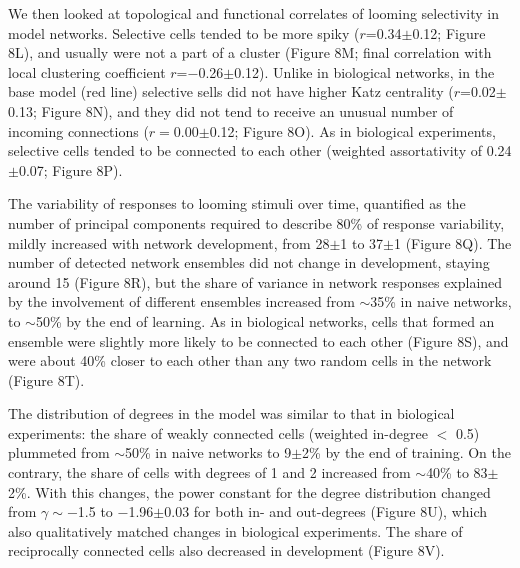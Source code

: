 \documentclass{article}
\begin{document}
We then looked at topological and functional correlates of looming selectivity in model networks. Selective cells tended to be more spiky ($r$=0.34$\pm$0.12; Figure 8L), and usually were not a part of a cluster (Figure 8M; final correlation with local clustering coefficient $r$=$-$0.26$\pm$0.12). Unlike in biological networks, in the base model (red line) selective sells did not have higher Katz centrality ($r$=0.02$\pm$0.13; Figure 8N), and they did not tend to receive an unusual number of incoming connections ($r=$0.00$\pm$0.12; Figure 8O). As in biological experiments, selective cells tended to be connected to each other (weighted assortativity of 0.24$\pm$0.07; Figure 8P). %

The variability of responses to looming stimuli over time, quantified as the number of principal components required to describe 80\% of response variability, mildly increased with network development, from 28$\pm$1 to 37$\pm$1 (Figure 8Q). The number of detected network ensembles did not change in development, staying around 15 (Figure 8R), but the share of variance in network responses explained by the involvement of different ensembles increased from $\sim$35\% in naive networks, to $\sim$50\% by the end of learning. As in biological networks, cells that formed an ensemble were slightly more likely to be connected to each other (Figure 8S), and were about 40\% closer to each other than any two random cells in the network (Figure 8T).

The distribution of degrees in the model was similar to that in biological experiments: the share of weakly connected cells (weighted in-degree $<$ 0.5) plummeted from $\sim$50\% in naive networks to 9$\pm$2\% by the end of training. On the contrary, the share of cells with degrees of 1 and 2 increased from $\sim$40\% to 83$\pm$2\%. With this changes, the power constant for the degree distribution changed from $\gamma \sim -$1.5 to $-$1.96$\pm$0.03 for both in- and out-degrees (Figure 8U), which also qualitatively matched changes in biological experiments. The share of reciprocally connected cells also decreased in development (Figure 8V).
\end{document}
